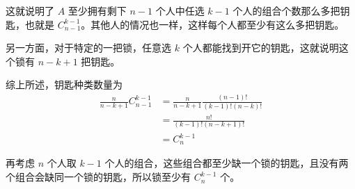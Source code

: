 这就说明了 $ A $ 至少拥有剩下 $ n - 1 $ 个人中任选 $ k - 1 $ 个人的组合个数那么多把钥匙，也就是 $ C_{n-1}^{k-1} $。其他人的情况也一样，这样每个人都至少有这么多把钥匙。

另一方面，对于特定的一把锁，任意选 $ k $ 个人都能找到开它的钥匙，这就说明这个锁有 $ n - k + 1 $ 把钥匙。

综上所述，钥匙种类数量为 
\begin{align*} 
\frac{n}{n-k+1}C_{n-1}^{k-1} &= \frac{n}{n-k+1}\frac{(n-1)!}{(k-1)!(n-k)!} \\
				&=\frac{n!}{(k-1)!(n-k+1)!} \\
				&=C_n^{k-1}
\end{align*}

再考虑 $ n $ 个人取 $ k - 1 $ 个人的组合，这些组合都至少缺一个锁的钥匙，且没有两个组合会缺同一个锁的钥匙，所以锁至少有 $ C_n^{k-1} $ 个。













